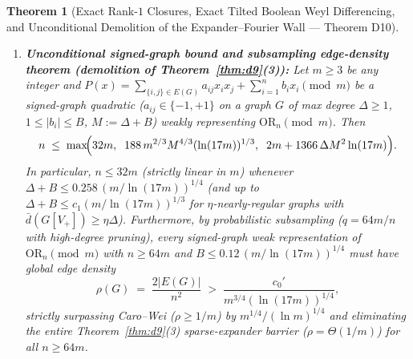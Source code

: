 \documentclass[11pt,a4paper]{article}
\newtheorem{theorem}{Theorem}[section]
\theoremstyle{definition}
\newcommand{\OR}{\mathrm{OR}}
\begin{document}
\begin{theorem}[Exact Rank-$1$ Closures, Exact Tilted Boolean Weyl Differencing, and Unconditional Demolition of the Expander--Fourier Wall --- Theorem D10]
\begin{enumerate}[leftmargin=*,nosep]
  \[
    \sum_{|t| \le T} \mathrm{Re}\, S(t) \;\ge\; L(T),
    \qquad
    M(x; 0.10) \;:=\; L(T) - 2\sum_{t=T+1}^\infty e^{-0.9 x^2 t^2} \;>\; 0.13 \;>\; \frac{1}{8} \qquad (\forall\, x > 0).
  \]
  \item \textbf{Unconditional signed-graph bound and subsampling edge-density theorem (demolition of Theorem~\ref{thm:d9}(3)):} Let $m \ge 3$ be any integer and $P(x) = \sum_{\{i,j\}\in E(G)} a_{ij} x_i x_j + \sum_{i=1}^n b_i x_i \pmod m$ be a signed-graph quadratic ($a_{ij} \in \{-1, +1\}$ on a graph $G$ of max degree $\Delta \ge 1$, $1 \le |b_i| \le B$, $M := \Delta + B$) weakly representing $\OR_n \pmod m$. Then
  \[
    n \;\le\; \max\!\Bigl(32 m,\;\; 188\, m^{2/3} M^{4/3} (\ln(17 m))^{1/3},\;\; 2 m + 1366\, \Delta M^2 \ln(17 m)\Bigr).
  \]
  In particular, $n \le 32 m$ (strictly linear in $m$) whenever $\Delta + B \le 0.258\,(m / \ln(17 m))^{1/4}$ (and up to $\Delta + B \le c_1 (m / \ln(17 m))^{1/3}$ for $\eta$-nearly-regular graphs with $\bar{d}(G[V_+]) \ge \eta\Delta$). Furthermore, by probabilistic subsampling ($q = 64m / n$ with high-degree pruning), every signed-graph weak representation of $\OR_n \pmod m$ with $n \ge 64m$ and $B \le 0.12\,(m / \ln(17 m))^{1/4}$ must have global edge density
  \[
    \rho(G) \;=\; \frac{2|E(G)|}{n^2} \;>\; \frac{c_0'}{m^{3/4} (\ln(17 m))^{1/4}},
  \]
  strictly surpassing Caro--Wei ($\rho \ge 1/m$) by $m^{1/4}/(\ln m)^{1/4}$ and eliminating the entire Theorem~\ref{thm:d9}(3) sparse-expander barrier ($\rho = \Theta(1/m)$) for all $n \ge 64m$.
\end{enumerate}
\end{theorem}
\end{document}
